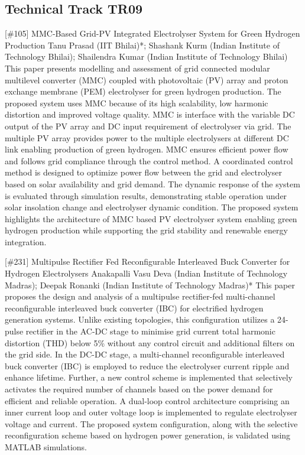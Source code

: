 \clearpage \subsection{Technical Track TR09}\nopagebreak {} \begin{abstract_online} {[\#105] MMC-Based Grid-PV Integrated Electrolyser System for Green Hydrogen Production } {} {Tanu Prasad (IIT Bhilai)*; Shashank Kurm (Indian Institute of Technology Bhilai); Shailendra  Kumar (Indian Institute of Technology Bhilai)} {} This paper presents modelling and assessment of grid connected modular multilevel converter (MMC) coupled with photovoltaic (PV) array and proton exchange membrane (PEM) electrolyser for green hydrogen production. The proposed system uses MMC because of its high scalability, low harmonic distortion and improved voltage quality. MMC is interface with the variable DC output of the PV array and DC input requirement of electrolyser via grid. The multiple PV array provides power to the multiple electrolysers at different DC link enabling production of green hydrogen. MMC ensures efficient power flow and follows grid compliance through the control method. A coordinated control method is designed to optimize power flow between the grid and electrolyser based on solar availability and grid demand. The dynamic response of the system is evaluated through simulation results, demonstrating stable operation under solar insolation change and electrolyser dynamic condition. The proposed system highlights the architecture of MMC based PV electrolyser system enabling green hydrogen production while supporting the grid stability and renewable energy integration. \end{abstract_online} 
{} \begin{abstract_online} {[\#231] Multipulse Rectifier Fed Reconfigurable Interleaved  Buck Converter for Hydrogen Electrolysers} {} {Anakapalli Vasu Deva (Indian Institute of Technology Madras); Deepak  Ronanki (Indian Institute of Technology Madras)*} {} This paper proposes the design and analysis of a multipulse rectifier-fed multi-channel reconfigurable interleaved buck converter (IBC) for electrified hydrogen generation systems. Unlike existing topologies, this configuration utilizes a 24-pulse rectifier in the AC-DC stage to minimise grid current total harmonic distortion (THD) below 5\% without any control circuit and additional filters on the grid side. In the DC-DC stage, a multi-channel reconfigurable interleaved buck converter (IBC) is employed to reduce the electrolyser current ripple and enhance lifetime. Further, a new control scheme is implemented that selectively activates the required number of channels based on the power demand for efficient and reliable operation. A dual-loop control architecture comprising an inner current loop and outer voltage loop is implemented to regulate electrolyser voltage and current. The proposed system configuration, along with the selective reconfiguration scheme based on hydrogen power generation, is validated using MATLAB simulations. \end{abstract_online} 
